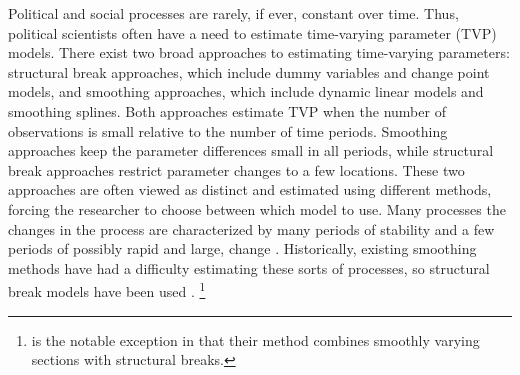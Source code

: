 

Political and social processes are rarely, if ever, constant over time.
Thus, political scientists often have a need to estimate time-varying parameter (TVP) models.
There exist two broad approaches to estimating time-varying parameters: structural break approaches, which include dummy variables and change point models, and smoothing approaches, which include dynamic linear models and smoothing splines.
Both approaches estimate TVP when the number of observations is small relative to the number of time periods. 
Smoothing approaches keep the parameter differences small in all periods, while structural break approaches restrict parameter changes to a few locations.
These two approaches are often viewed as distinct and estimated using different methods, forcing the researcher to choose between which model to use.
Many processes the changes in the process are characterized by many periods of stability and a few periods of possibly rapid and large, change \parencite{RatkovicEng2010}.
Historically, existing smoothing methods have had a difficulty estimating these sorts of processes, so structural break models have been used \parencites{CalderiaZorn1998}{Spirling2007a}{Spirling2007b}{Park2010}{Park2011}.%
\footnote{\textcite{RatkovicEng2010} is the notable exception in that their method combines smoothly varying sections with structural breaks.}

